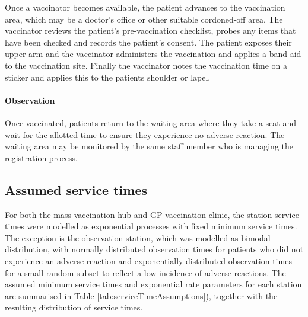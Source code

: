 \documentclass{article}
\begin{document}
Once a vaccinator becomes available, the patient advances to the
vaccination area, which may be a doctor's office or other suitable
cordoned-off area. The vaccinator reviews the patient's pre-vaccination
checklist, probes any items that have been checked and records the
patient's consent. The patient exposes their upper arm and the
vaccinator administers the vaccination and applies a band-aid to the
vaccination site. Finally the vaccinator notes the vaccination time on a
sticker and applies this to the patients shoulder or lapel.

\hypertarget{observation-1}{%
\paragraph{Observation}\label{observation-1}}

Once vaccinated, patients return to the waiting area where they take a
seat and wait for the allotted time to ensure they experience no adverse
reaction. The waiting area may be monitored by the same staff member who
is managing the registration process.

\hypertarget{assumed-service-times}{%
\subsection{Assumed service times}\label{assumed-service-times}}

For both the mass vaccination hub and GP vaccination clinic, the station
service times were modelled as exponential processes with fixed minimum
service times. The exception is the observation station, which was
modelled as bimodal distribution, with normally distributed observation
times for patients who did not experience an adverse reaction and
exponentially distributed observation times for a small random subset to
reflect a low incidence of adverse reactions. The assumed minimum
service times and exponential rate parameters for each station are
summarised in Table \ref{tab:serviceTimeAssumptions}), together with the
resulting distribution of service times.
\end{document}
